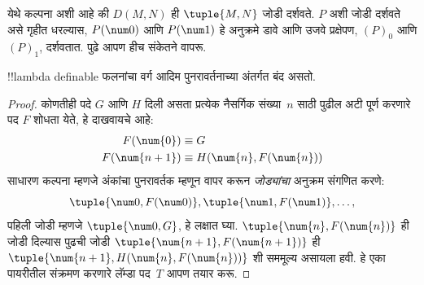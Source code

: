 \documentclass[../../../include/open-logic-section]{subfiles}
\begin{document}
येथे कल्पना अशी आहे की $D(M,N)$ ही $\tuple{M, N}$
जोडी दर्शवते. $P$ अशी जोडी दर्शवते असे गृहीत धरल्यास,
$P(\num 0)$ आणि $P(\num 1)$ हे अनुक्रमे डावे आणि उजवे
प्रक्षेपण, $(P)_0$ आणि $(P)_1$, दर्शवतात. पुढे आपण
हीच संकेतने वापरू.

\begin{lem}
!!{lambda definable} फलनांचा वर्ग आदिम पुनरावर्तनाच्या
अंतर्गत बंद असतो.
\end{lem}

\begin{proof}
कोणतीही पदे $G$ आणि $H$ दिली असता प्रत्येक नैसर्गिक
संख्या~$n$ साठी पुढील अटी पूर्ण करणारे पद $F$
शोधता येते, हे दाखवायचे आहे:
\begin{align*}
F(\num{0}) & \equiv G \\
F(\num{n+1}) & \equiv H(\num{n}, F(\num{n}))
\end{align*}
साधारण कल्पना म्हणजे अंकांचा पुनरावर्तक म्हणून वापर करून
\emph{जोड्यांचा} अनुक्रम संगणित करणे:
\[
\tuple{\num 0, F(\num 0)}, \tuple{\num 1, F(\num 1)}, \dots,
\]
पहिली जोडी म्हणजे $\tuple{\num 0, G}$, हे लक्षात घ्या.
$\tuple{\num{n}, F(\num{n})}$ ही जोडी दिल्यास पुढची जोडी
$\tuple{\num{n+1}, F(\num{n+1})}$ ही
$\tuple{\num{n+1}, H(\num{n}, F(\num{n}))}$ शी
सममूल्य असायला हवी. हे एका पायरीतील संक्रमण करणारे
लॅम्डा पद~$T$ आपण तयार करू.


\end{proof}
\end{document}
